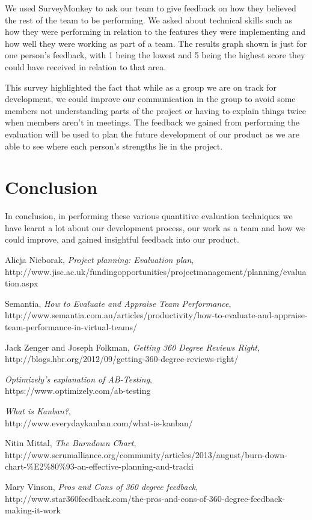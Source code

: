 \documentclass[10pt, a4paper]{article}
\begin{document}
We used SurveyMonkey to ask our team to give feedback on how they believed the rest of the team to be performing. We asked about technical skills such as how they were performing in relation to the features they were implementing and how well they were working as part of a team. The results graph shown is just for one person’s feedback, with 1 being the lowest and 5 being the highest score they could have received in relation to that area. 

This survey highlighted the fact that while as a group we are on track for development, we could improve our communication in the group to avoid some members not understanding parts of the project or having to explain things twice when members aren’t in meetings. The feedback we gained from performing the evaluation will be used to plan the future development of our product as we are able to see where each person’s strengths lie in the project.

\section{Conclusion}
In conclusion, in performing these various quantitive evaluation techniques we have learnt a lot about our development process, our work as a team and how we could improve, and gained insightful feedback into our product. 

\begin{thebibliography}{9}

  Alicja Nieborak, 
  \emph{Project planning: Evaluation plan},
  \\ http://www.jisc.ac.uk/fundingopportunities/projectmanagement/planning/evaluation.aspx
 
  Semantia, 
  \emph{How to Evaluate and Appraise Team Performance},
  \\ http://www.semantia.com.au/articles/productivity/how-to-evaluate-and-appraise-team-performance-in-virtual-teams/

  Jack Zenger and Joseph Folkman, 
  \emph{Getting 360 Degree Reviews Right}, 
  \\ http://blogs.hbr.org/2012/09/getting-360-degree-reviews-right/

  \emph{Optimizely’s explanation of AB-Testing},
  \\ https://www.optimizely.com/ab-testing

  \emph{What is Kanban?},
  \\ http://www.everydaykanban.com/what-is-kanban/
  
  Nitin Mittal, 
  \emph{The Burndown Chart}, 
  \\ http://www.scrumalliance.org/community/articles/2013/august/burn-down-chart-{\%}E2{\%}80{\%}93-an-effective-planning-and-tracki
  
  Mary Vinson, 
  \emph{Pros and Cons of 360 degree feedback}, 
  \\ http://www.star360feedback.com/the-pros-and-cons-of-360-degree-feedback-making-it-work

\end{thebibliography}
\end{document}

